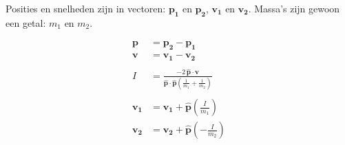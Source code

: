 \documentclass[12pt,a4paper]{article}
\begin{document}
	Posities en snelheden zijn in vectoren: $\mathbf{p_1}$ en $\mathbf{p_2}$, $\mathbf{v_1}$ en $\mathbf{v_2}$. Massa's zijn gewoon een getal: $m_1$ en $m_2$.
	
	
	\begin{equation}
		\begin{aligned}
			\mathbf{p} &= \mathbf{p_2} - \mathbf{p_1} \\
			\mathbf{v} &= \mathbf{v_1} - \mathbf{v_2} \\ 
			\\
			I &= \frac{-2 \, \mathbf{\hat p} \cdot \mathbf{v}}{\mathbf{\hat p} \cdot \mathbf{\hat p} \left( \frac{1}{m_1} + \frac{1}{m_2} \right)} \\
			\\
			\mathbf{v_1} &= \mathbf{v_1} + \mathbf{\hat p} \left( \frac{I}{m_1} \right) \\
			\mathbf{v_2} &= \mathbf{v_2} + \mathbf{\hat p} \left( -\frac{I}{m_2} \right) \\
		\end{aligned}
	\end{equation}
\end{document}
